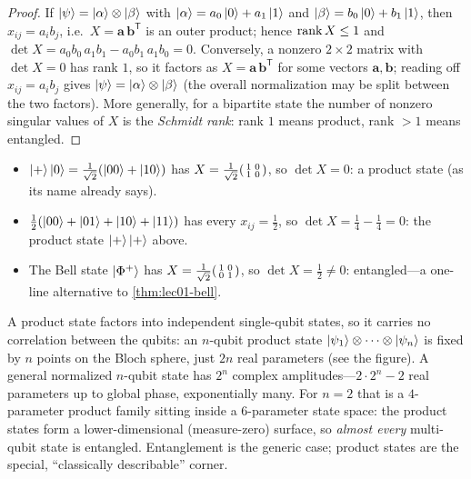\begin{proof}
If $\ket{\psi}=\ket{\alpha}\otimes\ket{\beta}$ with $\ket{\alpha}=a_0\ket0+a_1\ket1$ and
$\ket{\beta}=b_0\ket0+b_1\ket1$, then $x_{ij}=a_i b_j$, i.e.\ $X=\mathbf{a}\,\mathbf{b}^{\mathsf T}$
is an outer product; hence $\operatorname{rank} X\le1$ and
$\det X=a_0b_0\,a_1b_1-a_0b_1\,a_1b_0=0$. Conversely, a nonzero $2\times2$ matrix with
$\det X=0$ has rank $1$, so it factors as $X=\mathbf{a}\,\mathbf{b}^{\mathsf T}$ for some
vectors $\mathbf a,\mathbf b$; reading off $x_{ij}=a_ib_j$ gives
$\ket{\psi}=\ket{\alpha}\otimes\ket{\beta}$ (the overall normalization may be split between
the two factors). More generally, for a bipartite state the number of nonzero singular
values of $X$ is the \emph{Schmidt rank}: rank $1$ means product, rank $>1$ means entangled.
\end{proof}

\begin{example}\label{exa:lec01-septest}
\begin{itemize}[nosep,leftmargin=1.4em]
  \item $\ket{+}\ket{0}=\tfrac1{\sqrt2}(\ket{00}+\ket{10})$ has
        $X=\tfrac1{\sqrt2}\begin{psmallmatrix}1&0\\ 1&0\end{psmallmatrix}$, so $\det X=0$:
        a product state (as its name already says).
  \item $\tfrac12(\ket{00}+\ket{01}+\ket{10}+\ket{11})$ has every $x_{ij}=\tfrac12$, so
        $\det X=\tfrac14-\tfrac14=0$: the product state $\ket{+}\ket{+}$ above.
  \item The Bell state $\ket{\Phi^{+}}$ has
        $X=\tfrac1{\sqrt2}\begin{psmallmatrix}1&0\\ 0&1\end{psmallmatrix}$, so
        $\det X=\tfrac12\neq0$: entangled---a one-line alternative to
        \cref{thm:lec01-bell}.
\end{itemize}
\end{example}

\begin{remark}\label{rem:lec01-generic-ent}
A product state factors into independent single-qubit states, so it carries no
correlation between the qubits: an $n$-qubit product state
$\ket{\psi_1}\otimes\cdots\otimes\ket{\psi_n}$ is fixed by $n$ points on the Bloch sphere,
just $2n$ real parameters (see the figure). A general normalized $n$-qubit state has
$2^{n}$ complex amplitudes---$2\cdot2^{n}-2$ real parameters up to global phase,
exponentially many. For $n=2$ that is a $4$-parameter product family sitting inside a
$6$-parameter state space: the product states form a lower-dimensional (measure-zero)
surface, so \emph{almost every} multi-qubit state is entangled. Entanglement is the
generic case; product states are the special, ``classically describable'' corner.
\end{remark}

